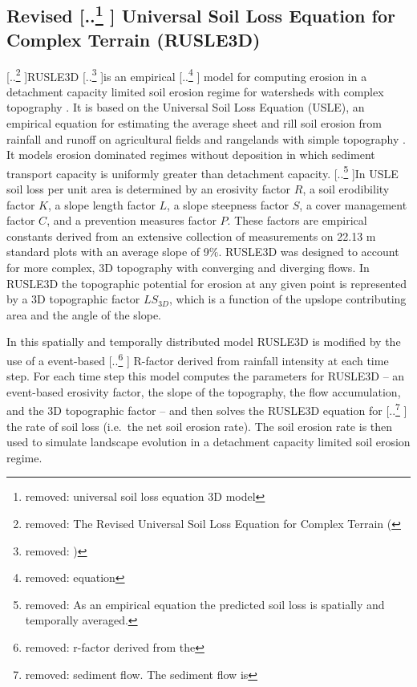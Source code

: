 \documentclass[gmd, manuscript]{copernicus}
\providecommand{\DIFadd}[1]{{\protect\color{blue} \sf #1}} %
\providecommand{\DIFdel}[1]{{\protect\color{red} [..\footnote{removed: #1} ]}} %
\providecommand{\DIFaddbegin}{} %
\providecommand{\DIFaddend}{} %
\providecommand{\DIFdelbegin}{} %
\providecommand{\DIFdelend}{} %
\begin{document}
\subsection{Revised \DIFdelbegin \DIFdel{universal soil loss equation 3D model}\DIFdelend \DIFaddbegin \DIFadd{Universal Soil Loss Equation for Complex Terrain (RUSLE3D)}\DIFaddend }
\label{rusle_model}
\DIFdelbegin \DIFdel{The Revised Universal Soil Loss Equation for Complex Terrain (}\DIFdelend RUSLE3D
\DIFdelbegin \DIFdel{) 
}\DIFdelend is an empirical \DIFdelbegin \DIFdel{equation }\DIFdelend \DIFaddbegin \DIFadd{model }\DIFaddend for computing erosion 
in a detachment capacity limited soil erosion regime
for watersheds with complex topography \citep{Mitasova1996}. 
It is based on 
the Universal Soil Loss Equation (USLE),
an empirical equation for estimating the average
sheet and rill soil erosion from rainfall and runoff
on agricultural fields and rangelands with simple topography 
\citep{Wischmeier1978}. 
It models erosion dominated regimes without deposition
in which sediment transport capacity is 
uniformly greater than detachment capacity.
\DIFdelbegin \DIFdel{As an empirical equation the predicted soil loss 
is spatially and temporally averaged. 
}\DIFdelend In USLE soil loss per unit area is determined by 
an erosivity factor $R$,
a soil erodibility factor $K$, 
a slope length factor $L$,
a slope steepness factor $S$,
a cover management factor $C$,
and a prevention measures factor $P$.
These factors are empirical constants derived 
from an extensive collection of measurements 
on 22.13 \unit{m} standard plots with an average slope of 9$\%$.  
RUSLE3D was designed to account for more complex, 3D topography 
with converging and diverging flows. 
In RUSLE3D the topographic potential for erosion at any given point 
is represented by a 3D topographic factor $LS_{3D}$,
which is a function of the upslope contributing area 
and the angle of the slope. 

In this spatially and temporally distributed model 
RUSLE3D is modified by the use of a 
event-based \DIFdelbegin \DIFdel{r-factor derived from the }\DIFdelend \DIFaddbegin \DIFadd{R-factor derived from }\DIFaddend rainfall intensity at each time step.
For each time step this model computes the parameters for RUSLE3D -- 
an event-based erosivity factor,
the slope of the topography, the flow accumulation, and
the 3D topographic factor -- 
and then solves the RUSLE3D equation for \DIFdelbegin \DIFdel{sediment flow. 
The sediment flow is }\DIFdelend \DIFaddbegin \DIFadd{the rate of soil loss 
(i.e.~the net soil erosion rate). 
The soil erosion rate is then }\DIFaddend used to simulate landscape evolution 
in a detachment capacity limited soil erosion regime.
\end{document}
